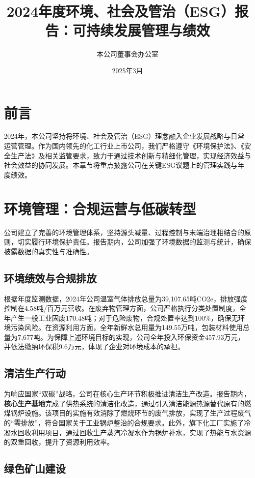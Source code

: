 \documentclass[a4paper,12pt]{article}
\title{\textbf{2024年度环境、社会及管治（ESG）报告：可持续发展管理与绩效}}
\author{本公司董事会办公室}
\date{2025年3月}
\begin{document}
\maketitle

\section*{前言}

2024年，本公司坚持将环境、社会及管治（ESG）理念融入企业发展战略与日常运营管理。作为国内领先的化工行业上市公司，我们严格遵守《环境保护法》、《安全生产法》及相关监管要求，致力于通过技术创新与精细化管理，实现经济效益与社会效益的协同发展。本章节将重点披露公司在关键ESG议题上的管理实践与年度绩效。

\section{环境管理：合规运营与低碳转型}

公司建立了完善的环境管理体系，坚持源头减量、过程控制与末端治理相结合的原则，切实履行环境保护责任。报告期内，公司加强了环境数据的监测与统计，确保披露数据的真实性与准确性。

\subsection{环境绩效与合规排放}

根据年度监测数据，2024年公司温室气体排放总量为39,107.65吨CO2e，排放强度控制在4.58吨/百万元营收。在废弃物管理方面，公司严格执行分类处置制度，全年产生一般工业固废170.48吨；对于危险废物，合规处置率达到100\%，确保无环境污染风险。在资源利用方面，全年新鲜水总用量为149.55万吨，包装材料使用总量为7,677吨。为保障上述环境目标的实现，公司全年投入环保资金457.93万元，并依法缴纳环保税9.6万元，体现了企业对环境成本的承担。

\subsection{清洁生产行动}

为响应国家“双碳”战略，公司在核心生产环节积极推进清洁生产改造。报告期内，\textbf{核心生产基地}完成了供热系统的清洁化改造，通过引入清洁能源热源替代原有的燃煤锅炉设施。该项目的实施有效消除了燃烧环节的废气排放，实现了生产过程废气的“零排放”，符合国家关于工业锅炉整治的合规要求。此外，旗下化工厂实施了冷凝水回收利用项目，通过回收生产蒸汽冷凝水作为锅炉补水，实现了热能与水资源的双重回收，提升了资源利用效率。

\subsection{绿色矿山建设}
\end{document}
